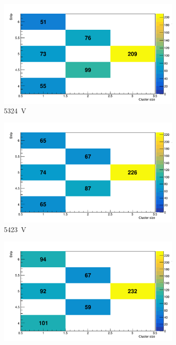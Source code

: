 \begin{figure}[H]
\begin{subfigure}{.33\linewidth}
		    \centering
			\includegraphics[width=\linewidth]{fig/chapt6/Muon-ClS-5200-gRPC-INFN.pdf}
			\caption{\label{fig:cluster-size-2D:C} \SI{5324}{V}}
		\end{subfigure}
		\begin{subfigure}{.33\linewidth}
		    \centering
			\includegraphics[width=\linewidth]{fig/chapt6/Muon-ClS-5300-gRPC-INFN.pdf}
			\caption{\label{fig:cluster-size-2D:D} \SI{5423}{V}}
		\end{subfigure}
		\begin{subfigure}{.33\linewidth}
		    \centering
			\includegraphics[width=\linewidth]{fig/chapt6/Muon-ClS-5400-gRPC-INFN.pdf}

\end{subfigure}
\end{figure}
